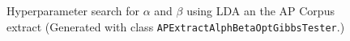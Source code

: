 \documentclass[10pt, a4paper, oneside]{article}
\begin{document}
\begin{figure}
\caption{Hyperparameter search for $\alpha$ and $\beta$ using LDA an the AP Corpus extract (Generated with class \texttt{APExtractAlphBetaOptGibbsTester}.)}
\label{perplexity5}
\end{figure}
\end{document}

